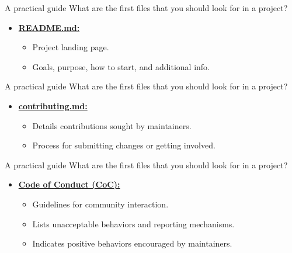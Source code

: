 \begin{frame}{A practical guide}
    What are the first files that you should look for in a project?
    \begin{itemize}
    \item \href{https://github.com/firstcontributions/first-contributions/blob/main/README.md}{\textbf{README.md:}}
        \begin{itemize}
            \item Project landing page.
            \item Goals, purpose, how to start, and additional info.
        \end{itemize}
    \end{itemize}

\end{frame}

\begin{frame}{A practical guide}
    What are the first files that you should look for in a project?
    \begin{itemize}
    \item \href{https://github.com/firstcontributions/first-contributions/blob/main/Contributors.md}{\textbf{contributing.md:}}
        \begin{itemize}
            \item Details contributions sought by maintainers.
            \item Process for submitting changes or getting involved.
        \end{itemize}
    \end{itemize}

\end{frame}

\begin{frame}{A practical guide}
    What are the first files that you should look for in a project?
    \begin{itemize}
        \item \href{https://github.com/firstcontributions/first-contributions/blob/main/CODE_OF_CONDUCT.md}{\textbf{Code of Conduct (CoC):}}
        \begin{itemize}
            \item Guidelines for community interaction.
            \item Lists unacceptable behaviors and reporting mechanisms.
            \item Indicates positive behaviors encouraged by maintainers.
        \end{itemize}
    \end{itemize}

\end{frame}

